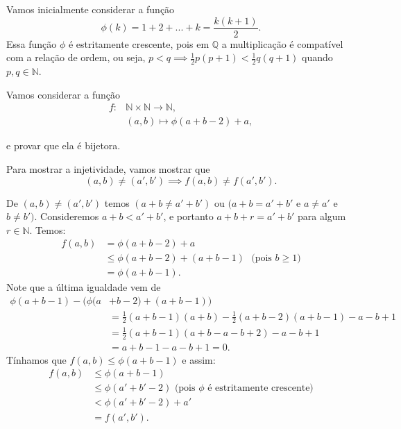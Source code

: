 \documentclass[../main.tex]{subfiles}
\begin{document}
\begin{dem}
    Vamos inicialmente considerar a função 
    \[\phi(k) = 1 + 2 + ... + k = \frac{k(k+1)}{2}.\]
    Essa função $\phi$ é estritamente crescente, pois em $\mathbb{Q}$ a multiplicação é compatível com a relação de ordem, ou seja, $p < q \implies \frac{1}{2} p (p+1) < \frac{1}{2} q (q+1)$ quando $p,q \in \mathbb{N}$.

    Vamos considerar a função 
    \begin{align*}
        f \colon &\mathbb{N} \times \mathbb{N} \to \mathbb{N}, \\
        &(a,b) \mapsto \phi(a+b-2) + a,
    \end{align*}
    
    e provar que ela é bijetora.
    
    Para mostrar a injetividade, vamos mostrar que 
    \[ (a,b) \neq (a',b') \implies f(a,b) \neq f(a',b'). \]

    De $(a,b) \neq (a',b')$ temos $(a+b \neq a'+b')$ ou $(a+b = a'+b'$ e $a \neq a' $ e $ b \neq b')$.
    Consideremos $a+b < a'+b'$, e portanto $a+b+r = a'+b'$ para algum $r \in \mathbb{N}$. Temos:
    \begin{align*}
        f(a,b) 
        &= \phi(a+b-2) + a \\
        &\leq \phi(a+b-2) + (a+b-1) \hspace{4pt} \text{ (pois $b \geq 1$)} \\
        &=  \phi(a+b-1).
    \end{align*}
    Note que a última igualdade vem de
    \begin{align*}
        \phi(a+b-1) - \big(  \phi(a&+b-2) + (a+b-1) \big) \\
        &= \frac{1}{2}(a+b-1)(a+b) - \frac{1}{2}(a+b-2)(a+b-1) - a - b + 1 \\
        &= \frac{1}{2}(a+b-1)(a+b -a-b+2) - a - b + 1 \\
        &= a+b-1-a-b+1 = 0.   
    \end{align*}
    Tínhamos que $f(a,b) \leq \phi(a+b-1)$ e assim: 
    \begin{align*}
        f(a,b) &\leq \phi(a+b-1) \\
        &\leq \phi(a' + b' -2) \text{ (pois $\phi$ é estritamente crescente)} \\
        &< \phi(a'+b' - 2) + a' \\
        &= f(a',b').
    \end{align*}


\end{dem}
\end{document}
